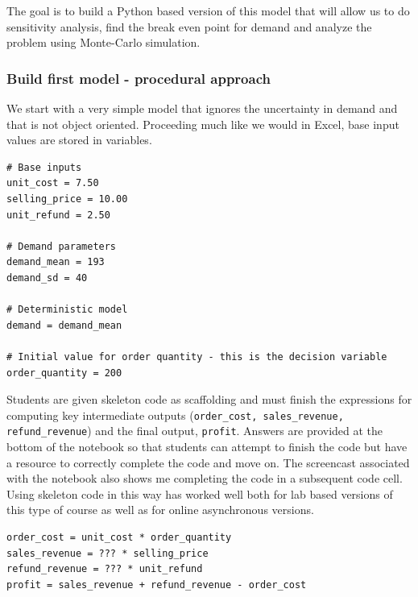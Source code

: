 \documentclass[ited,blindrev]{informs3}              %
\newcommand{\code}[1]{\texttt{#1}}
\begin{document}
The goal is to build a Python based version of this model that will allow us to do sensitivity analysis, find the break even point for demand and analyze the problem using Monte-Carlo simulation.

\subsubsection{Build first model - procedural approach}
 
We start with a very simple model that ignores the uncertainty in demand and that is not object oriented. Proceeding much like we would in Excel, base input values are stored in variables. 

\begin{tcolorbox}
\begin{verbatim}
# Base inputs
unit_cost = 7.50
selling_price = 10.00
unit_refund = 2.50

# Demand parameters
demand_mean = 193
demand_sd = 40

# Deterministic model
demand = demand_mean

# Initial value for order quantity - this is the decision variable
order_quantity = 200
\end{verbatim}
\end{tcolorbox}



Students are given skeleton code as scaffolding and must finish the expressions for computing key intermediate outputs (\code{order\_cost, sales\_revenue, refund\_revenue}) and the final output, \code{profit}. Answers are provided at the bottom of the notebook so that students can attempt to finish the code but have a resource to correctly complete the code and move on. The screencast associated with the notebook also shows me completing the code in a subsequent code cell. Using skeleton code in this way has worked well both for lab based versions of this type of course as well as for online asynchronous versions.

\begin{tcolorbox}
\begin{verbatim}
order_cost = unit_cost * order_quantity
sales_revenue = ??? * selling_price
refund_revenue = ??? * unit_refund
profit = sales_revenue + refund_revenue - order_cost
\end{verbatim}
\end{tcolorbox}
\end{document}
